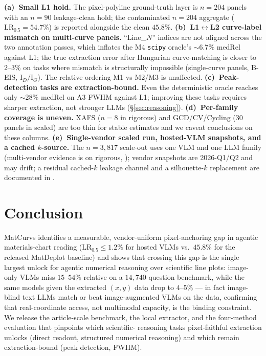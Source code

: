 \documentclass{article}
\begin{document}
\textbf{(a)~Small L1 hold.} The pixel-polyline ground-truth layer
is $n{=}204$ panels with an $n{=}90$ leakage-clean hold; the
contaminated $n{=}204$ aggregate ($\mathrm{LR}_{0.5}{=}54.7\%$) is
reported alongside the clean $45.8\%$.
\textbf{(b)~L1$\leftrightarrow$L2 curve-label mismatch on multi-curve
panels.} ``Line\_$N$'' indices are not aligned across the two
annotation passes, which inflates the M4 \texttt{scipy} oracle's
$\sim 6.7\%$ medRel against L1; the true extraction error after
Hungarian curve-matching is closer to $2\text{--}3\%$ on tasks
where mismatch is structurally impossible (single-curve panels,
B-EIS, $\mathrm{I}_D/\mathrm{I}_G$). The relative ordering M1 vs
M2/M3 is unaffected.
\textbf{(c)~Peak-detection tasks are extraction-bound.} Even the
deterministic oracle reaches only $\sim 28\%$ medRel on A3 FWHM
against L1; improving these tasks requires sharper extraction, not
stronger LLMs (\S\ref{sec:reasoning}).
\textbf{(d)~Per-family coverage is uneven.} XAFS ($n{=}8$ in
rigorous) and GCD/CV/Cycling ($30$ panels in scaled) are too thin
for stable estimates and we caveat conclusions on these columns.
\textbf{(e)~Single-vendor scaled run, hosted-VLM snapshots, and a
cached $k$-source.} The $n{=}3{,}817$ scale-out uses one VLM and
one LLM family (multi-vendor evidence is on rigorous,
); vendor snapshots are 2026-Q1/Q2
and may drift; a residual cached-$k$ leakage channel and a
silhouette-$k$ replacement are documented in .

\section{Conclusion}
\label{sec:conclusion}
MatCurvs identifies a measurable, vendor-uniform pixel-anchoring
gap in agentic materials-chart reading
($\mathrm{LR}_{0.5}{\le}1.2\%$ for hosted VLMs vs.\ $45.8\%$ for
the released MatDeplot baseline) and shows that crossing this gap
is the single largest unlock for agentic numerical reasoning over
scientific line plots: image-only VLMs miss
$15\text{--}54\%$ relative on a $14{,}740$-question benchmark,
while the same models given the extracted $(x,y)$ data drop to
$4\text{--}5\%$ --- in fact image-blind text LLMs match or beat
image-augmented VLMs on the data, confirming that real-coordinate
access, not multimodal capacity, is the binding constraint.
We release the article-scale benchmark, the local extractor, and
the four-method evaluation that pinpoints which scientific-
reasoning tasks pixel-faithful extraction unlocks (direct readout,
structured numerical reasoning) and which remain extraction-bound
(peak detection, FWHM).
\end{document}
